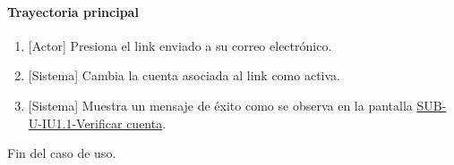 \paragraph{Trayectoria principal}
	\begin{enumerate}
		\item {[Actor]} Presiona el link enviado a su correo electrónico.
		\item {[Sistema]} Cambia la cuenta asociada al link como activa.
		\item {[Sistema]} Muestra un mensaje de éxito como se observa en la pantalla \hyperref[fig:sub-u-iu1.1]{SUB-U-IU1.1-Verificar cuenta}.
	\end{enumerate}
	Fin del caso de uso.

